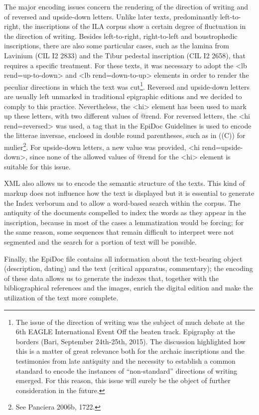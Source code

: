 \documentclass[amsthm,ebook]{saparticle}
\begin{document}
The major encoding issues concern the rendering of the direction of writing and of reversed and upside-down letters.
Unlike later texts, predominantly left-to-right, the inscriptions of the ILA corpus show a certain degree of
fluctuation in the direction of writing. Besides left-to-right, right-to-left and boustrophedic inscriptions, there are
also some particular cases, such as the lamina from Lavinium (CIL I2 2833) and the Tibur pedestal inscription (CIL I2
2658), that requires a specific treatment. For these texts, it was necessary to adopt the {\textless}lb
rend={\textquotedbl}up-to-down{\textquotedbl}{\textgreater} and {\textless}lb
rend={\textquotedbl}down-to-up{\textquotedbl}{\textgreater} elements in order to render the peculiar directions in
which the text was cut\footnote{The issue of the direction of writing was the subject of much debate at the 6th EAGLE
International Event Off the beaten track. Epigraphy at the borders (Bari, September 24th{}-25th, 2015). The discussion
highlighted how this is a matter of great relevance both for the archaic inscriptions and the testimonies from late
antiquity and the necessity to establish a common standard to encode the instances of “non-standard” directions of
writing emerged. For this reason, this issue will surely be the object of further consideration in the future.}.
Reversed and upside-down letters are usually left unmarked in traditional epigraphic editions and we decided to comply
to this practice. Nevertheless, the {\textless}hi{\textgreater} element has been used to mark up these letters, with
two different values of @rend. For reversed letters, the {\textless}hi
rend={\textquotedbl}reversed{\textquotedbl}{\textgreater} was used, a tag that in the EpiDoc Guidelines is used to
encode the litterae inversae, enclosed in double round parentheses, such as in ((C)) for mulier\footnote{See Panciera
2006b, 1722.}. For upside-down letters, a new value was provided, {\textless}hi
rend={\textquotedbl}upside-down{\textquotedbl}{\textgreater}, since none of the allowed values of @rend for the
{\textless}hi{\textgreater} element is suitable for this issue.

XML also allows us to encode the semantic structure of the texts. This kind of markup does not influence how the text is
displayed but it is essential to generate the Index verborum and to allow a word-based search within the corpus. The
antiquity of the documents compelled to index the words as they appear in the inscription, because in most of the cases
a lemmatization would be forcing; for the same reason, some sequences that remain difficult to interpret were not
segmented and the search for a portion of text will be possible. 

Finally, the EpiDoc file contains all information about the text-bearing object (description, dating) and the text
(critical apparatus, commentary); the encoding of these data allows us to generate the indexes that, together with the
bibliographical references and the images, enrich the digital edition and make the utilization of the text more
complete. 




\end{document}
